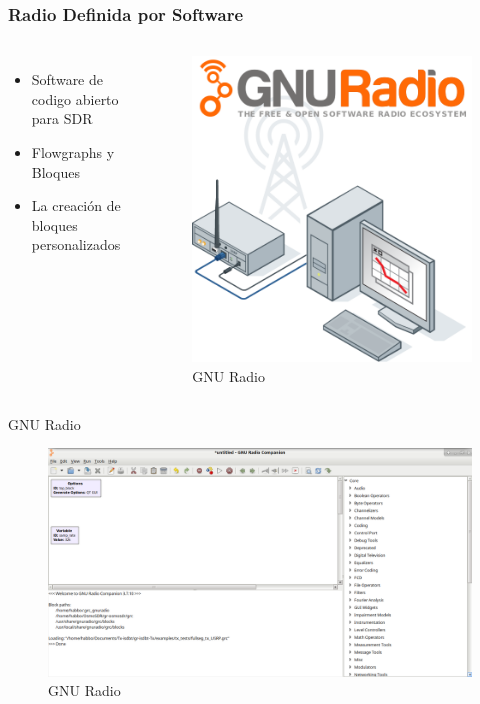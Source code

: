 \begin{frame}
\frametitle{Radio Definida por Software}
\begin{columns}
	\begin{itemize}	
		\item { Software de codigo abierto para SDR}
		\item {	Flowgraphs y Bloques }
		\item { La creación de bloques personalizados }
	\end{itemize}
	\begin{figure}
		\includegraphics[scale=0.25]{sdr}
		\caption{GNU Radio}
	\end{figure}
\end{columns}
\end{frame}

\begin{frame}{GNU Radio}
	\begin{figure}
	\includegraphics[scale=0.22]{grc}
	\caption{GNU Radio}
	\end{figure}
\end{frame}

